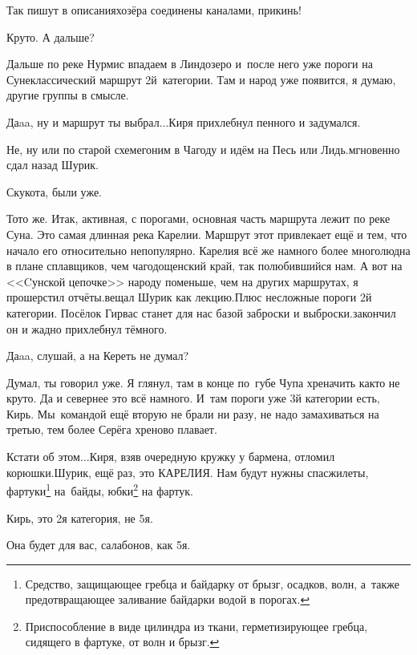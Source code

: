 \diagdash Так пишут в описаниях\mdash озёра соединены каналами, прикинь!

\diagdash Круто. А дальше? 

\diagdash Дальше по реке Нурмис впадаем в Линдозеро и~после него уже пороги на Суне\mdash классический маршрут 2\sdash й~категории. Там и народ уже появится, я думаю, другие группы в смысле.

\diagdash Да\sdash a\sdash a, ну и маршрут ты выбрал$\ldots$\mdash Киря прихлебнул пенного и задумался.

\diagdash Не, ну или по старой схеме\mdash гоним в Чагоду и идём на Песь или Лидь.\mdash мгновенно сдал назад Шурик.

\diagdash Скукота, были уже.

\diagdash То\sdash то же. Итак, активная, с порогами, основная часть маршрута лежит по реке Суна. Это самая длинная река Карелии. Маршрут этот привлекает ещё и тем, что начало его относительно непопулярно. Карелия всё же намного более многолюдна в плане сплавщиков, чем чагодощенский край, так полюбившийся нам. А вот на <<Cунской цепочке>> народу поменьше, чем на других маршрутах, я прошерстил отчёты.\mdash вещал Шурик как лекцию.\mdash Плюс несложные пороги 2\sdash й категории. Посёлок Гирвас станет для нас базой заброски и выброски.\mdash закончил он и жадно прихлебнул тёмного.

\diagdash Да\sdash a\sdash a, слушай, а на Кереть не думал?

\diagdash Думал, ты говорил уже. Я глянул, там в конце по~губе Чупа хреначить как\sdash то не круто. Да и севернее это всё намного. И~там пороги уже 3\sdash й категории есть, Кирь. Мы~командой ещё вторую не брали ни разу, не надо замахиваться на третью, тем более Серёга хреново плавает. 

\renewcommand*{\thefootnote}{\arabic{footnote}}
\diagdash Кстати об этом$\ldots$\mdash Киря, взяв очередную кружку у бармена, отломил корюшки.\mdash Шурик, ещё раз, это КАРЕЛИЯ. Нам будут нужны спасжилеты, фартуки\footnote{Средство, защищающее гребца и байдарку от брызг, осадков, волн, а~также предотвращающее заливание байдарки водой в порогах.} на~байды, юбки\footnote{Приспособление в виде цилиндра из ткани, герметизирующее гребца, сидящего в фартуке, от волн и брызг.} на фартук.

\diagdash Кирь, это 2\sdash я категория, не 5\sdash я.

\diagdash Она будет для вас, салабонов, как 5\sdash я.

